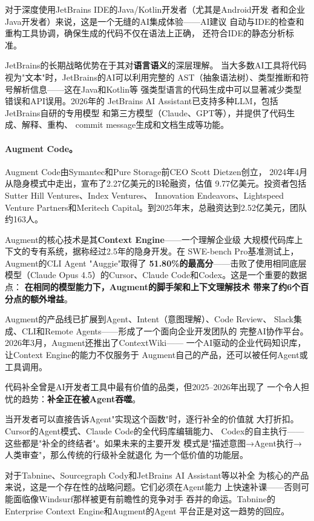 对于深度使用JetBrains IDE的Java/Kotlin开发者（尤其是Android开发
者和企业Java开发者）来说，这是一个无缝的AI集成体验——AI建议
自动与IDE的检查和重构工具协调，确保生成的代码不仅在语法上正确，
还符合IDE的静态分析标准。

JetBrains的长期战略优势在于其对\textbf{语言语义}的深层理解。
当大多数AI工具将代码视为"文本"时，JetBrains的AI可以利用完整的
AST（抽象语法树）、类型推断和符号解析信息——这在Java和Kotlin等
强类型语言的代码生成中可以显著减少类型错误和API误用。2026年的
JetBrains AI Assistant已支持多种LLM，包括JetBrains自研的专用模型
和第三方模型（Claude、GPT等），并提供了代码生成、解释、重构、
commit message生成和文档生成等功能。

\paragraph{Augment Code。}
Augment Code由Symantec和Pure Storage前CEO Scott Dietzen创立，
2024年4月从隐身模式中走出，宣布了2.27亿美元的B轮融资，估值
9.77亿美元。投资者包括Sutter Hill Ventures、Index Ventures、
Innovation Endeavors、Lightspeed Venture Partners和Meritech
Capital。到2025年末，总融资达到2.52亿美元，团队约163人。

Augment的核心技术是其\textbf{Context Engine}——一个理解企业级
大规模代码库上下文的专有系统，据称经过2.5年的隐身开发。在
SWE-bench Pro基准测试上，Augment的CLI Agent "Auggie"取得了
\textbf{51.80\%的最高分}——击败了使用相同底层模型（Claude Opus
4.5）的Cursor、Claude Code和Codex。这是一个重要的数据点：
\textbf{在相同的模型能力下，Augment的脚手架和上下文理解技术
带来了约6个百分点的额外增益}。

Augment的产品线已扩展到Agent、Intent（意图理解）、Code Review、
Slack集成、CLI和Remote Agents——形成了一个面向企业开发团队的
完整AI协作平台。2026年3月，Augment还推出了ContextWiki——
一个AI驱动的企业代码知识库，让Context Engine的能力不仅服务于
Augment自己的产品，还可以被任何Agent或工具调用。

\begin{warnbox}
代码补全曾是AI开发者工具中最有价值的品类，但2025--2026年出现了
一个令人担忧的趋势：\textbf{补全正在被Agent吞噬}。

当开发者可以直接告诉Agent"实现这个函数"时，逐行补全的价值就
大打折扣。Cursor的Agent模式、Claude Code的全代码库编辑能力、
Codex的自主执行——这些都是"补全的终结者"。如果未来的主要开发
模式是"描述意图→Agent执行→人类审查"，那么传统的行级补全就退化
为一个低价值的功能层。

对于Tabnine、Sourcegraph Cody和JetBrains AI Assistant等以补全
为核心的产品来说，这是一个存在性的战略问题。它们必须在Agent能力
上快速补课——否则可能面临像Windsurf那样被更有前瞻性的竞争对手
吞并的命运。Tabnine的Enterprise Context Engine和Augment的Agent
平台正是对这一趋势的回应。
\end{warnbox}

